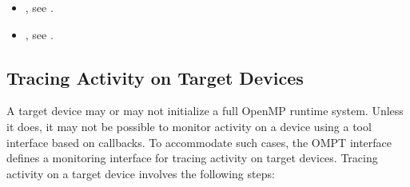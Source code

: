 \crossreferences
\begin{itemize}
\item {}, see .
\item {}, see .
\end{itemize}




\subsection{Tracing Activity on Target Devices}
\label{sec:tracing-device-activity}

A target device may or may not initialize a full OpenMP runtime system.
Unless it does, it may not be possible to monitor activity 
on a device using a tool interface based on callbacks.
To accommodate such cases, the OMPT interface defines 
a monitoring interface for tracing activity on target
devices. Tracing activity on a target device involves the following
steps:

